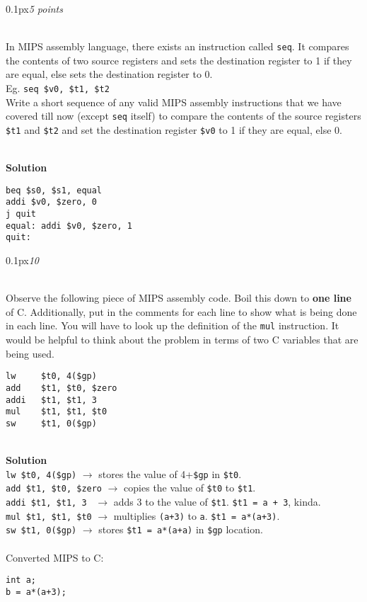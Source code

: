 \documentclass[11pt]{article}
\newcommand{\problem}[2]{\begin{adjustwidth}{0.1px}\noindent \framebox[1.2\width]{\large Problem #1}\hfill \emph{#2} \end{adjustwidth} \bigskip\\}
\newcommand{\code}[1]{{\texttt{#1}}}
\begin{document}
\newpage
\problem{6}{5 points}
In MIPS assembly language, there exists an instruction called \code{seq}. It compares the contents of two source registers and sets the destination register to 1 if they are equal, else sets the destination register to 0. \\
Eg. \code{seq \$v0, \$t1, \$t2}
\\
Write a short sequence of any valid MIPS assembly instructions that we have covered till now (except \code{seq} itself) to compare the contents of the source registers \code{\$t1} and \code{\$t2} and set the destination register \code{\$v0} to 1 if they are equal, else 0.


\bigskip \\
\textbf{Solution}\\
\begin{lstlisting}[style=MIPS]
beq $s0, $s1, equal
addi $v0, $zero, 0
j quit
equal: addi $v0, $zero, 1
quit:
\end{lstlisting}





\newpage
\problem{7}{10}
Observe the following piece of MIPS assembly code. Boil this down to \textbf{one line} of C. Additionally, put in the comments for each line to show what is being done in each line. You will have to look up the definition of the \code{mul} instruction. It would be helpful to think about the problem in terms of two C variables that are being used.
\begin{lstlisting}[style=MIPS]
lw     $t0, 4($gp)      	
add    $t1, $t0, $zero   	
addi   $t1, $t1, 3       	
mul    $t1, $t1, $t0     	
sw     $t1, 0($gp)
\end{lstlisting}
\bigskip \\
\textbf{Solution}\\
\code{lw     \$t0, 4(\$gp)} $\rightarrow$ stores the value of 4+\code{\$gp} in \code{\$t0}.\\
\code{add    \$t1, \$t0, \$zero} $\rightarrow$ copies the value of \code{\$t0} to \code{\$t1}.\\
\code{addi   \$t1, \$t1, 3 } $\rightarrow$ adds 3 to the value of \code{\$t1}. \code{\$t1 = a + 3}, kinda.\\
\code{mul    \$t1, \$t1, \$t0} $\rightarrow$ multiplies \code{(a+3)} to \code{a}. \code{\$t1 = a*(a+3)}.\\
\code{sw     \$t1, 0(\$gp)} $\rightarrow$ stores \code{\$t1 = a*(a+a)} in \code{\$gp} location.\\
\\
Converted MIPS to C:
\begin{lstlisting}[style=C]
int a;
b = a*(a+3);

\end{lstlisting}
\end{document}
